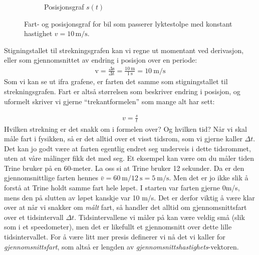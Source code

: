 \begin{figure}[H]
\begin{subfigure}{0.48\textwidth}
  \caption{Posisjonsgraf $s(t)$}
\end{subfigure}
\caption{Fart- og posisjonsgraf for bil som passerer lyktestolpe med
         konstant hastighet $v = 10\,\mathrm{m/s}$.}
\label{fig:fart- og strekningsgrafer}
\end{figure}

Stigningstallet til strekningsgrafen kan vi regne ut momentant ved derivasjon, eller som gjennomsnittet av endring i posisjon over en periode:
\begin{align*}
    \textrm{v} = \frac{\Delta\textrm{s}}{\Delta\textrm{t}} = \frac{\SI{10}{\metre}}{\SI{1}{\second}} = \SI{10}{\metre\per\second}
\end{align*}
Som vi kan se ut ifra grafene, er farten det samme som stigningstallet til strekningsgrafen. Fart er altså størrelsen som beskriver endring i posisjon, og uformelt skriver vi gjerne ``trekantformelen'' som mange alt har sett: 

\begin{align}
    v=\frac{s}{t}
\end{align}
Hvilken strekning er det snakk om i formelen over? Og hvilken tid? Når vi skal måle fart i fysikken, så er det alltid over et visst tidsrom, som vi gjerne kaller $\Delta t$. Det kan jo godt være at farten egentlig endret seg underveis i dette tidsrommet, uten at våre målinger fikk det med seg. Et eksempel kan være om du måler tiden Trine bruker på en 60-meter. La oss si at Trine bruker 12 sekunder. Da er den gjennomsnittlige farten hennes $\bar{v}=\SI{60}{\metre}/\SI{12}{\second}=\SI{5}{\metre\per\second}.$ Men det er jo ikke slik å forstå at Trine holdt samme fart hele løpet. I starten var farten gjerne 0m/s, mens den på slutten av løpet kanskje var 10 m/s. Det er derfor viktig å være klar over at når vi snakker om \textit{målt} fart, så handler det alltid om gjennomsnittsfart over et tidsintervall $\Delta t$. Tidsintervallene vi måler på kan være veldig små (slik som i et speedometer), men det er likefullt et gjennomsnitt over dette lille tidsintervallet. For å være litt mer presis definerer vi nå det vi kaller for \textit{gjennomsnittsfart}, som altså er lengden av \textit{gjennomsnittshastighets}-vektoren.

